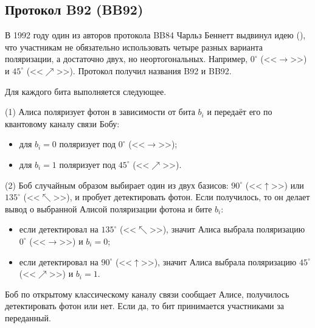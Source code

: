 \subsection{Протокол B92 (BB92)}

В 1992 году один из авторов протокола BB84 Чарльз Беннетт выдвинул идею (\cite{Bennett:1992}), что участникам не обязательно использовать четыре разных варианта поляризации, а достаточно двух, но неортогональных. Например, $0^{\circ}$ (<<$\to$>>) и $45^{\circ}$ (<<$\nearrow$>>). Протокол получил названия B92 и BB92.

Для каждого бита выполняется следующее.

\begin{protocol}
    \item[(1)] Алиса поляризует фотон в зависимости от бита $b_i$ и передаёт его по квантовому каналу связи Бобу:
        \begin{itemize}
            \item для $b_i=0$ поляризует под $0^{\circ}$ (<<$\to$>>);
            \item для $b_i=1$ поляризует под $45^{\circ}$ (<<$\nearrow$>>).
        \end{itemize}
    \item[(2)] Боб случайным образом выбирает один из двух базисов: $90^{\circ}$ (<<$\uparrow$>>) или $135^{\circ}$ (<<$\nwarrow$>>), и пробует детектировать фотон. Если получилось, то он делает вывод о выбранной Алисой поляризации фотона и бите $b_i$:
        \begin{itemize}
            \item если детектировал на $135^{\circ}$ (<<$\nwarrow$>>), значит Алиса выбрала поляризацию $0^{\circ}$ (<<$\to$>>) и $b_i=0$;
            \item если детектировал на $90^{\circ}$ (<<$\uparrow$>>), значит Алиса выбрала поляризацию $45^{\circ}$ (<<$\nearrow$>>) и $b_i=1$.
        \end{itemize}
    \item[{}] Боб по открытому классическому каналу связи сообщает Алисе, получилось детектировать фотон или нет. Если да, то бит принимается участниками за переданный.
\end{protocol}

